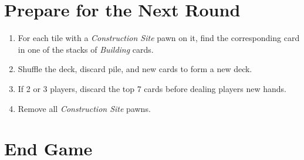 \documentclass[10pt]{article}
\newenvironment{enumerateCustom}
{\begin{enumerate}
  \setlength{\itemsep}{1pt}
  \setlength{\parskip}{0pt}
  \setlength{\parsep}{0pt}}
{\end{enumerate}}
\begin{document}
\begin{mdframed}[style = customFrame]
\begin{multicols*}{2}
\section*{Prepare for the Next Round}
\begin{enumerateCustom}
	\item For each tile with a \emph{Construction Site} pawn on it, find the corresponding card in one of the stacks of \emph{Building} cards.
	\item Shuffle the deck, discard pile, and new cards to form a new deck.
	\item If 2 or 3 players, discard the top 7 cards before dealing players new hands.
	\item Remove all \emph{Construction Site} pawns.
\end{enumerateCustom}

\section*{End Game}

\end{multicols*}
\end{mdframed}
\end{document}
